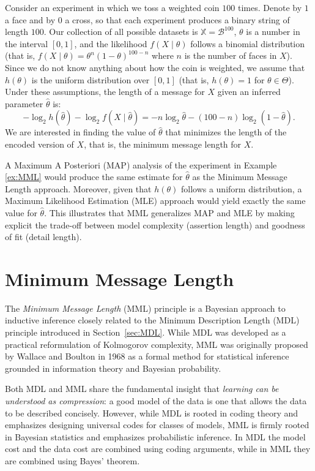 \begin{example}
\label{ex:MML}
Consider an experiment in which we toss a weighted coin $100$ times. Denote by $1$ a face and by $0$ a cross, so that each experiment produces a binary string of length $100$. Our collection of all possible datasets is $\mathbb{X} = \mathcal{B}^{100}$, $\theta$ is a number in the interval $[0, 1]$, and the likelihood $f (X \mid \theta)$ follows a binomial distribution (that is, $f (X \mid \theta) = \theta^n (1-\theta)^{100-n}$ where $n$ is the number of faces in $X$). Since we do not know anything about how the coin is weighted, we assume that $h(\theta)$ is the uniform distribution over $[0, 1]$ (that is, $h(\theta) = 1$ for $\theta \in \Theta$). Under these assumptions, the length of a message for $X$ given an inferred parameter $\hat\theta$ is:
\[
- \log_2 h \left( \hat\theta \right) - \log_2 f \left( X \mid \hat\theta \right) = - n \log_2 \hat\theta - (100-n) \log_2 (1 - \hat\theta).
\]
We are interested in finding the value of $\hat\theta$ that minimizes the length of the encoded version of $X$, that is, the minimum message length for $X$.
\end{example}

A Maximum A Posteriori (MAP) analysis of the experiment in Example \ref{ex:MML} would produce the same estimate for $\hat\theta$ as the Minimum Message Length approach. Moreover, given that $h(\theta)$ follows a uniform distribution, a Maximum Likelihood Estimation (MLE) approach would yield exactly the same value for $\hat\theta$. This illustrates that MML generalizes MAP and MLE by making explicit the trade-off between model complexity (assertion length) and goodness of fit (detail length).

%
%

\section{Minimum Message Length}
\label{sec:MML}

The \emph{Minimum Message Length} (MML) principle is a Bayesian approach to inductive inference closely related to the Minimum Description Length (MDL) principle introduced in Section~\ref{sec:MDL}. 
While MDL was developed as a practical reformulation of Kolmogorov complexity, MML was originally proposed by Wallace and Boulton in 1968 as a formal method for statistical inference grounded in information theory and Bayesian probability.

Both MDL and MML share the fundamental insight that \emph{learning can be understood as compression}: a good model of the data is one that allows the data to be described concisely. 
However, while MDL is rooted in coding theory and emphasizes designing universal codes for classes of models, MML is firmly rooted in Bayesian statistics and emphasizes probabilistic inference.
In MDL the model cost and the data cost are combined using coding arguments, while in MML they are combined using Bayes’ theorem.

